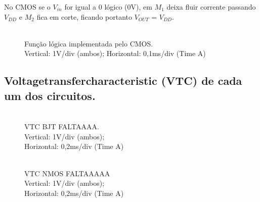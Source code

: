 \documentclass[pdftex,12pt,a4paper]{report}
\begin{document}
No CMOS se o $V_{in}$ for igual a 0 lógico (0V), em $M_1$ deixa fluir corrente passando $V_{DD}$ e $M_2$ fica em corte, ficando portanto $V_{OUT}$ = $V_{DD}$.

\begin{figure}[h]
  \centerline{}
  \caption{\\Função lógica implementada pelo CMOS. \\Vertical: 1V/div (ambos); Horizontal: 0,1ms/div (Time A)}\label{cmos}
\end{figure}

\newpage
\subsection{Voltagetransfercharacteristic (VTC) de cada um dos circuitos.}
\begin{figure}[!htb]
  \centerline{}
  \caption{\\VTC BJT FALTAAAA. \\Vertical: 1V/div (ambos); \\Horizontal: 0,2ms/div (Time A)}\label{bjt}
\endminipage\hfill
{}
  \centerline{}
  \caption{\\VTC NMOS FALTAAAAA \\Vertical: 1V/div (ambos); \\Horizontal: 0,2ms/div (Time A)}\label{fig:nmos}
\endminipage\hfill
\end{figure}
\end{document}

